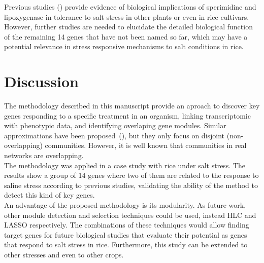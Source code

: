 \documentclass[12pt,journal, onecolumn]{IEEEtran}
\begin{document}
Previous studies (\cite{gupta2013plant, hou2015persimmon, mittova2002salt, peng2019novel, roychoudhury2011amelioration}) provide evidence of biological implications of sperimidine and lipoxygenase in tolerance to salt stress in other plants or even in rice cultivars. However, further studies are needed to elucidate the detailed biological function of the remaining 14 genes that have not been named so far,  which may have a potential relevance in stress responsive mechanisms to salt conditions in rice.






\section{Discussion}

The methodology described in this manuscript provide an aproach to discover key genes responding to a specific treatment in an organism, linking transcriptomic with phenotypic data, and identifying overlaping gene modules. Similar approximations have been proposed~(\cite{langfelder2008wgcna, du2019network}), but they only focus on disjoint (non-overlapping) communities. However, it is well known that communities in real networks are overlapping. \\

The methodology was applied in a case study with rice under salt stress. The results show a group of 14 genes where two of them are related to the response to saline stress according to previous studies, validating the ability of the method to detect this kind of key genes.\\

An advantage of the proposed methodology is its modularity. As future work, other module detection and selection techniques could be used, instead HLC and LASSO respectively. The combinations of these techniques would allow finding target genes for future biological studies that evaluate their potential as genes that respond to salt stress in rice. Furthermore, this study can be extended to other stresses and even to other crops.\\




\end{document}
